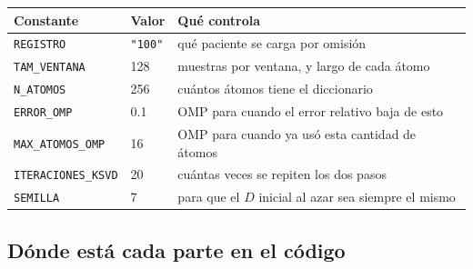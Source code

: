 \documentclass[11pt,letterpaper]{article}
\begin{document}
\begin{center}
\begin{tabular}{llp{7.2cm}}
    \toprule
    \textbf{Constante} & \textbf{Valor} & \textbf{Qué controla} \\
    \midrule
    \texttt{REGISTRO}         & \texttt{"100"}
        & qué paciente se carga por omisión \\
    \texttt{TAM\_VENTANA}     & 128
        & muestras por ventana, y largo de cada átomo \\
    \texttt{N\_ATOMOS}        & 256
        & cuántos átomos tiene el diccionario \\
    \texttt{ERROR\_OMP}       & 0.1
        & OMP para cuando el error relativo baja de esto \\
    \texttt{MAX\_ATOMOS\_OMP} & 16
        & OMP para cuando ya usó esta cantidad de átomos \\
    \texttt{ITERACIONES\_KSVD} & 20
        & cuántas veces se repiten los dos pasos \\
    \texttt{SEMILLA}          & 7
        & para que el $D$ inicial al azar sea siempre el mismo \\
    \bottomrule
\end{tabular}
\end{center}

\subsection*{Dónde está cada parte en el código}
\end{document}

